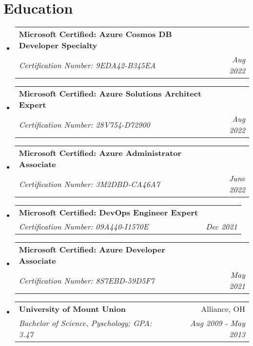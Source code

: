 \documentclass[letterpaper,11pt]{article}
\makeatletter
\newcommand{\resumeSubheading}[4]{
  \vspace{-1pt}\item
    \begin{tabular*}{0.97\textwidth}[t]{l@{\extracolsep{\fill}}r}
      \textbf{#1} & #2 \\
      \textit{\small#3} & \textit{\small #4} \\
    \end{tabular*}\vspace{-5pt}
}
\newcommand{\resumeSubHeadingListStart}{\begin{itemize}[leftmargin=*]}
\newcommand{\resumeSubHeadingListEnd}{\end{itemize}}
\makeatother
\begin{document}
\section{Education}
  \resumeSubHeadingListStart
    \resumeSubheading
      {Microsoft Certified: Azure Cosmos DB Developer Specialty}{}
      {Certification Number: 9EDA42-B345EA}{Aug 2022}
    \resumeSubheading
      {Microsoft Certified: Azure Solutions Architect Expert}{}
      {Certification Number: 28V754-D72900}{Aug 2022}
    \resumeSubheading
      {Microsoft Certified: Azure Administrator Associate}{}
      {Certification Number: 3M2DBD-CA46A7}{June 2022}
    \resumeSubheading
      {Microsoft Certified: DevOps Engineer Expert}{}
      {Certification Number: 09A440-I1570E}{Dec 2021}
    \resumeSubheading
      {Microsoft Certified: Azure Developer Associate}{}
      {Certification Number: 8S7EBD-59D5F7}{May 2021}
    \resumeSubheading
      {University of Mount Union}{Alliance, OH}
      {Bachelor of Science, Pyschology;  GPA: 3.47}{Aug 2009 - May 2013}
  \resumeSubHeadingListEnd


%
%

\end{document}
